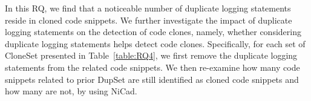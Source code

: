 \begin{table}
  \caption{Manual study results on the recall of clone detection tool on duplicate logging statements. Both the {\sf Clones} and {\sf Micro-clones} are labeled manually and they are not detected by the clone detection tool. }
    \vspace{-0.3cm}
    \centering
    \tabcolsep=8pt
    \vspace{-0.3cm}

    \label{table:manualrq4}
\end{table}





\label{sec:appendix3}
In this RQ, we find that a noticeable number of duplicate logging statements reside in cloned code snippets. %
We further investigate the impact of duplicate logging statements on the detection of code clones, namely, whether considering duplicate logging statements helps detect code clones. Specifically, for each set of 
{\sf CloneSet} presented in Table~\ref{table:RQ4}, we first remove the duplicate logging statements from the related code snippets. We then re-examine how many code snippets related to prior {\sf DupSet} are still identified as cloned code snippets and how many are not, by using NiCad.



